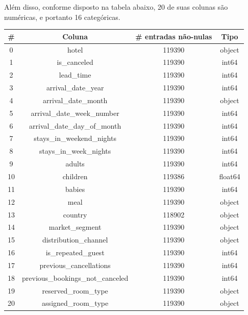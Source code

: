 \documentclass{homework}
\begin{document}
Além disso, conforme disposto na tabela abaixo, 20 de suas colunas são numéricas, e portanto 16 categóricas.

\begin{table}[h!]
\centering
    \begin{tabular}{|c|c|c|c|}
        \hline
        \textbf{\#} & \textbf{Coluna} & \textbf{\# entradas não-nulas} & \textbf{Tipo} \\
        \hline
        0 & hotel & 119390 & object \\
        \hline
        1 & is\_canceled & 119390 & int64 \\
        \hline
        2 & lead\_time & 119390 & int64 \\
        \hline
        3 & arrival\_date\_year & 119390 & int64 \\
        \hline
        4 & arrival\_date\_month & 119390 & object \\
        \hline
        5 & arrival\_date\_week\_number & 119390 & int64 \\
        \hline
        6 & arrival\_date\_day\_of\_month & 119390 & int64 \\
        \hline
        7 & stays\_in\_weekend\_nights & 119390 & int64 \\
        \hline
        8 & stays\_in\_week\_nights & 119390 & int64 \\
        \hline
        9 & adults & 119390 & int64 \\
        \hline
        10 & children & 119386 & float64 \\
        \hline
        11 & babies & 119390 & int64 \\
        \hline
        12 & meal & 119390 & object \\
        \hline
        13 & country & 118902 & object \\
        \hline
        14 & market\_segment & 119390 & object \\
        \hline
        15 & distribution\_channel & 119390 & object \\
        \hline
        16 & is\_repeated\_guest & 119390 & int64 \\
        \hline
        17 & previous\_cancellations & 119390 & int64 \\
        \hline
        18 & previous\_bookings\_not\_canceled & 119390 & int64 \\
        \hline
        19 & reserved\_room\_type & 119390 & object \\
        \hline
        20 & assigned\_room\_type & 119390 & object \\

\end{tabular}
\end{table}
\end{document}
